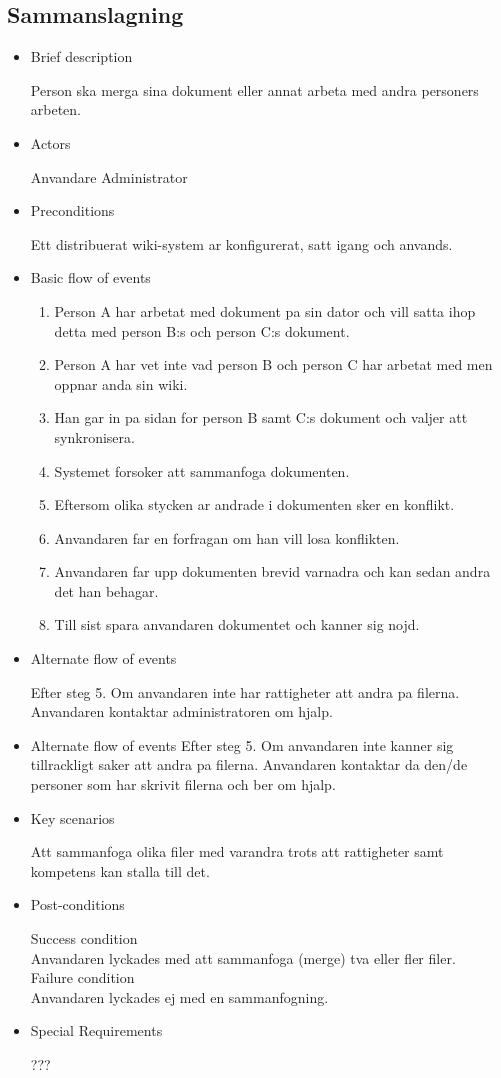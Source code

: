 \subsection{Sammanslagning}
\begin{itemize}
	\item Brief description
	
	Person ska merga sina dokument eller annat arbeta med andra personers arbeten.
	\item Actors
	
	Anvandare
	Administrator	
	\item Preconditions
	
	Ett distribuerat wiki-system ar konfigurerat, satt igang och anvands.
	\item Basic flow of events
	
	\begin{enumerate}
		\item Person A har arbetat med dokument pa sin dator och vill satta ihop detta med person B:s och person C:s dokument.
		\item Person A har vet inte vad person B och person C har arbetat med men oppnar anda sin wiki.
		\item Han gar in pa sidan for person B samt C:s dokument och valjer att synkronisera.
		\item Systemet forsoker att sammanfoga dokumenten.
		\item Eftersom olika stycken ar andrade i dokumenten sker en konflikt.
		\item Anvandaren far en forfragan om han vill losa konflikten.
		\item Anvandaren far upp dokumenten brevid varnadra och kan sedan andra det han behagar.
		\item Till sist spara anvandaren dokumentet och kanner sig nojd.
	\end{enumerate}
	\item Alternate flow of events
	
	Efter steg 5. Om anvandaren inte har rattigheter att andra pa filerna.
	Anvandaren kontaktar administratoren om hjalp.
	\item Alternate flow of events
	Efter steg 5. Om anvandaren inte kanner sig tillrackligt saker att andra pa filerna.
	Anvandaren kontaktar da den/de personer som har skrivit filerna och ber om hjalp.
	\item Key scenarios
	
	Att sammanfoga olika filer med varandra trots att rattigheter samt kompetens kan stalla till det.
	\item Post-conditions	
	
		Success condition 
		\\
		Anvandaren lyckades med att sammanfoga (merge) tva eller fler filer.
		\\
		Failure condition
		\\
		Anvandaren lyckades ej med en sammanfogning.
		
	\item Special Requirements
	
	???
\end{itemize}


